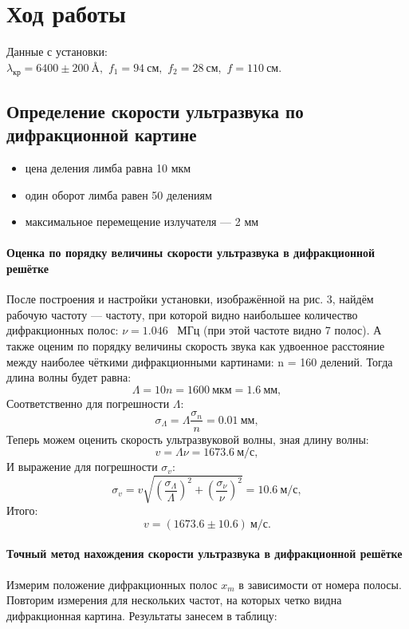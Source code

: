 \documentclass[14pt,a4paper]{article}
\begin{document}
\section*{Ход работы}
Данные с установки: \\
$\lambda_\text{кр} = 6400 \pm 200 \ \text{Å},$ \quad $f_1 = 94 \ \text{см},$ \quad $f_2 = 28 \ \text{см},$ \quad $f = 110 \ \text{см}.$
\subsection*{Определение скорости ультразвука по дифракционной картине}
\begin{itemize}
    \item цена деления лимба равна 10 мкм
    \item один оборот лимба равен 50 делениям
    \item максимальное перемещение излучателя --- 2 мм
\end{itemize}
\paragraph*{Оценка по порядку величины скорости ультразвука в дифракционной решётке \\}
После построения и настройки установки, изображённой на рис. 3, найдём рабочую частоту --- частоту, при которой видно наибольшее количество дифракционных полос: $\nu = 1.046$ \ МГц (при этой частоте видно 7 полос). А также оценим по порядку величины скорость звука как удвоенное расстояние между наиболее чёткими дифракционными картинами:
n = 160 делений.
Тогда длина волны будет равна:
\[
\Lambda = 10n = 1600 \ \text{мкм} = 1.6 \ \text{мм} ,
\]
Соответственно для погрешности $\Lambda$:
\[
\sigma_{\Lambda} = \Lambda \frac{\sigma_{n}}{n} = 0.01 \ \text{мм},
\]
Теперь можем оценить скорость ультразвуковой волны, зная длину волны:
\[
v = \Lambda\nu = 1673.6 \ \text{м/с},
\]
И выражение для погрешности $\sigma_v$:
\[
\sigma_v = v \sqrt{\left ( \frac{\sigma_{\Lambda}}{\Lambda} \right ) ^2 + \left ( \frac{\sigma_{\nu}}{\nu} \right ) ^2} = 10.6 \ \text{м/с},
\]
Итого:
\[
\boxed{v = (1673.6 \pm 10.6) \ \text{м/с}.}
\]

\newpage

\paragraph*{Точный метод нахождения скорости ультразвука в дифракционной решётке \\}
Измерим положение дифракционных полос $x_m$ в зависимости от номера полосы. Повторим измерения для нескольких частот, на которых четко видна дифракционная картина. Результаты занесем в таблицу:
\end{document}
